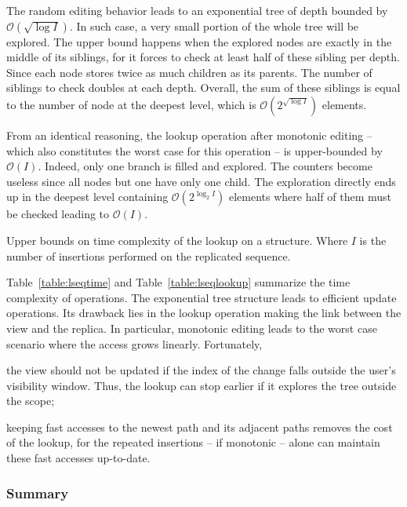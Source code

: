 The random editing behavior leads to an exponential tree of depth bounded by
$\mathcal{O}(\sqrt{\log I})$. In such case, a very small portion of the whole
tree will be explored. The upper bound happens when the explored nodes are
exactly in the middle of its siblings, for it forces to check at least half of
these sibling per depth. Since each node stores twice as much children as its
parents. The number of siblings to check doubles at each depth. Overall, the sum
of these siblings is equal to the number of node at the deepest level, which is
$\mathcal{O}(2^{\sqrt{\log I}})$ elements. 

From an identical reasoning, the lookup operation after monotonic editing --
which also constitutes the worst case for this operation -- is upper-bounded by
$\mathcal{O}(I)$. Indeed, only one branch is filled and explored. The counters
become useless since all nodes but one have only one child. The exploration
directly ends up in the deepest level containing $\mathcal{O}(2^{\log_2 I})$
elements where half of them must be checked leading to
$\mathcal{O}(I)$.

\begin{table}
  \caption{\label{table:lseqlookup}
    Upper bounds on time complexity of the lookup on a \LSEQ structure.
    Where $I$ is the number of insertions performed on the replicated sequence.}
  \centering
  
\end{table}

Table~\ref{table:lseqtime} and Table~\ref{table:lseqlookup} summarize the time
complexity of operations. The exponential tree structure leads to efficient
update operations. Its drawback lies in the lookup operation making the link
between the view and the replica. In particular, monotonic editing leads to the
worst case scenario where the access grows linearly. Fortunately,
\begin{inparaenum}[(i)]
\item the view should not be updated if the index of the change falls outside
  the user's visibility window. Thus, the lookup can stop earlier if it explores
  the tree outside the scope;
\item keeping fast accesses to the newest path and its adjacent paths removes
  the cost of the lookup, for the repeated insertions -- if monotonic -- alone
  can maintain these fast accesses up-to-date.
\end{inparaenum}

\subsubsection{Summary}

